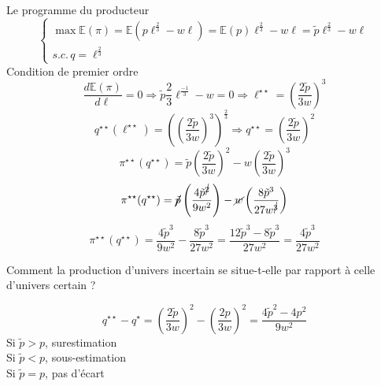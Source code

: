 \documentclass[12pt, a4paper]{exam}
\begin{document}
\begin{questions}
\begin{solution}
	Le programme du producteur
	\[  
	\begin{cases}
		\max \mathbb{E}(\pi)= \mathbb{E}\left( p\ell^{\frac{2}{3}}-w\ell\right) =\mathbb{E}(p)\ell^{\frac{2}{3}}-w\ell=\tilde{p}\ell^{\frac{2}{3}}-w\ell\\
		s.c. \, q = \ell^{\frac{2}{3}}
	\end{cases}
	\]
	Condition de premier ordre 
	\[ 
	\frac{d \mathbb{E}(\pi)}{d \ell}=0 \Rightarrow \tilde{p}\frac{2}{3}\ell^{\frac{-1}{3}}-w=0\Rightarrow \ell^{\star\star}=\left(\frac{2\tilde{p}}{3w} \right)^3 
	\]
	\[ 
	q^{\star\star}(\ell^{\star\star})=\left( \left(\frac{2\tilde{p}}{3w} \right)^3\right)^{\frac{2}{3}} \Rightarrow q^{\star\star}=\left(\frac{2\tilde{p}}{3w} \right)^2
	\]
	\[ 
	\pi^{\star\star}(q^{\star\star})=\tilde{p}\left(\frac{2\tilde{p}}{3w} \right)^2- w\left(\frac{2\tilde{p}}{3w} \right)^3 
	\]
	\[ 
	\pi^{\star\star}(q^{\star\star})= \cancel{\tilde{p}} \left(\frac{4\tilde{p}^{\cancel{2}}}{9w^2} \right)- \cancel{w}\left(\frac{8\tilde{p}^3}{27w^{\cancel{3}}} \right) 
	\]
	\[ 
	\pi^{\star\star}(q^{\star\star})=\frac{4\tilde{p}^3}{9w^2}-\frac{8\tilde{p}^3}{27w^2}=\frac{12\tilde{p}^3-8\tilde{p}^3}{27w^2}=\frac{4\tilde{p}^3}{27w^2}
	\]
\end{solution}

	\question[1,25] Comment la production d'univers incertain se situe-t-elle par rapport à celle d'univers certain ? 


\begin{solution}
\[ 
q^{\star\star}-q^{\star}=\left(\frac{2\tilde{p}}{3w} \right)^2-\left(\frac{2p}{3w} \right)^2=\frac{{4\tilde{p}^2-4p^2}}{9w^2}
\]
Si \(\tilde{p}>p\), surestimation \\ 
Si \(\tilde{p}<p\), sous-estimation \\
Si \(\tilde{p}=p\), pas d'écart
\end{solution}
\end{questions}
\end{document}
